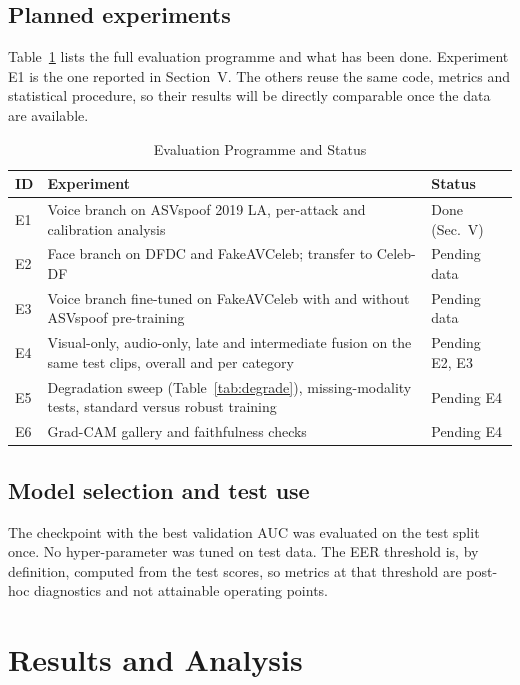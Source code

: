 \documentclass[conference]{IEEEtran}
\begin{document}
\subsection{Planned experiments}
Table~\ref{tab:plan} lists the full evaluation programme and what has been done. Experiment E1 is the one reported in Section~V. The others reuse the same code, metrics and statistical procedure, so their results will be directly comparable once the data are available.

\begin{table}[!t]
\caption{Evaluation Programme and Status}
\label{tab:plan}
\centering
\footnotesize
\begin{tabular}{@{}>{\raggedright\arraybackslash}p{0.55cm}>{\raggedright\arraybackslash}p{3.3cm}>{\raggedright\arraybackslash}p{1.7cm}@{}}
\toprule
ID & Experiment & Status\\
\midrule
E1 & Voice branch on ASVspoof 2019 LA, per-attack and calibration analysis & Done (Sec.~V)\\
E2 & Face branch on DFDC and FakeAVCeleb; transfer to Celeb-DF & Pending data\\
E3 & Voice branch fine-tuned on FakeAVCeleb with and without ASVspoof pre-training & Pending data\\
E4 & Visual-only, audio-only, late and intermediate fusion on the same test clips, overall and per category & Pending E2, E3\\
E5 & Degradation sweep (Table~\ref{tab:degrade}), missing-modality tests, standard versus robust training & Pending E4\\
E6 & Grad-CAM gallery and faithfulness checks & Pending E4\\
\bottomrule
\end{tabular}
\end{table}

\subsection{Model selection and test use}
The checkpoint with the best validation AUC was evaluated on the test split once. No hyper-parameter was tuned on test data. The EER threshold is, by definition, computed from the test scores, so metrics at that threshold are post-hoc diagnostics and not attainable operating points.

\section{Results and Analysis}
\end{document}
